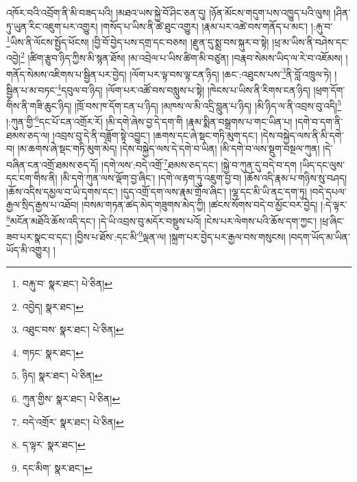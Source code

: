འཁོར་བའི་འབྲོག་ནི་མི་བཟད་པའི། །མཐའ་ཡས་སྐྱེ་བོ་ཤིང་ཅན་དུ། །ཉོན་མོངས་གདུག་པས་འཁྱུད་པའི་ལུས། །ཤིན་ཏུ་ཡུན་རིང་འཇུག་པར་འགྱུར། །གསོད་པ་ཡིས་ནི་ཚེ་ཐུང་འགྱུར། །རྣམ་པར་འཚེ་བས་གནོད་པ་མང་། །:རྐུ་བ་\footnote{བརྐུ་བ་  སྣར་ཐང་།  པེ་ཅིན། }ཡིས་ནི་ལོངས་སྤྱོད་ཕོངས། །བྱི་བོ་བྱེད་པས་དགྲ་དང་བཅས། །རྫུན་དུ་སྨྲ་བས་སྐུར་བ་སྟེ། །ཕྲ་མ་ཡིས་ནི་བཤེས་དང་འབྱེ།\footnote{འབྱེད།  སྣར་ཐང་། } །ཚིག་རྩུབ་ཉིད་ཀྱིས་མི་སྙན་ཐོས། །མ་འབྲེལ་པ་ཡིས་ཚིག་མི་བཙུན། །བརྣབ་སེམས་ཡིད་ལ་རེ་བ་འཇོམས། །གནོད་སེམས་འཇིགས་པ་སྦྱིན་པར་བྱེད། །ལོག་པར་ལྟ་བས་ལྟ་ངན་ཉིད། །ཆང་:འཐུངས་པས་\footnote{འཐུང་བས་  སྣར་ཐང་།  པེ་ཅིན། }ནི་བློ་འཁྲུལ་ཏེ། །སྦྱིན་པ་མ་བཏང་\footnote{གཏང་  སྣར་ཐང་། }དབུལ་བ་ཉིད། །ལོག་པར་འཚོ་བས་བསླུས་པ་སྟེ། །ཁེངས་པ་ཡིས་ནི་རིགས་ངན་ཉིད། །ཕྲག་དོག་གིས་ནི་གཟི་ཆུང་ཉིད། །ཁྲོ་བས་ཁ་དོག་ངན་པ་ཉིད། །མཁས་ལ་མི་འདྲི་བླུན་པ་ཉིད། །མི་ཉིད་ལ་ནི་འབྲས་བུ་འདི།\footnote{ཉིད།  སྣར་ཐང་།  པེ་ཅིན། } །:ཀུན་གྱི་\footnote{ཀུན་གྱིས་  སྣར་ཐང་།  པེ་ཅིན། }དང་པོ་ངན་འགྲོར་རོ། །མི་དགེ་ཞེས་བྱ་དེ་དག་གི །རྣམ་སྨིན་བསྒྲགས་པ་གང་ཡིན་པ། །དགེ་བ་དག་ནི་ཐམས་ཅད་ལ། །འབྲས་བུ་དེ་ནི་བཟློག་སྟེ་འབྱུང་། །ཆགས་དང་ཞེ་སྡང་གཏི་མུག་དང་། །དེས་བསྐྱེད་ལས་ནི་མི་དགེ་བ། །མ་ཆགས་ཞེ་སྡང་གཏི་མུག་མེད། །དེས་བསྐྱེད་ལས་དེ་དགེ་བ་ཡིན། །མི་དགེ་བ་ལས་སྡུག་བསྔལ་ཀུན། །དེ་བཞིན་ངན་འགྲོ་ཐམས་ཅད་དོ། །དགེ་ལས་:བདེ་འགྲོ་\footnote{བདེ་འགྲོར་  སྣར་ཐང་།  པེ་ཅིན། }ཐམས་ཅད་དང་། །སྐྱེ་བ་ཀུན་དུ་བདེ་བ་དག །ཡིད་དང་ལུས་དང་ངག་གིས་ནི། །མི་དགེ་ཀུན་ལས་ལྡོག་བྱ་ཞིང་། །དགེ་ལ་རྟག་ཏུ་འཇུག་བྱ་བ། །ཆོས་འདི་རྣམ་པ་གཉིས་སུ་བཤད། །ཆོས་འདིས་དམྱལ་བ་ཡི་དྭགས་དང་། །དུད་འགྲོ་དག་ལས་རྣམ་གྲོལ་ཞིང་། །ལྷ་དང་མི་ཡི་ནང་དག་ཏུ། །བདེ་དཔལ་རྒྱལ་སྲིད་རྒྱས་པ་འཐོབ། །བསམ་གཏན་ཚད་མེད་གཟུགས་མེད་ཀྱི། །ཚངས་སོགས་བདེ་བ་མྱོང་བར་བྱེད། །:དེ་ལྟར་\footnote{ད་ལྟར་  སྣར་ཐང་། }མངོན་མཐོའི་ཆོས་འདི་དང་། །དེ་ཡི་འབྲས་བུ་མདོར་བསྡུས་པའོ། །ངེས་པར་ལེགས་པའི་ཆོས་དག་ཀྱང་། །ཕྲ་ཞིང་ཟབ་པར་སྣང་བ་དང་། །བྱིས་པ་ཐོས་:དང་མི་\footnote{དང་མིག་  སྣར་ཐང་། }ལྡན་ལ། །སྐྲག་པར་བྱེད་པར་རྒྱལ་བས་གསུངས། །བདག་ཡོད་མ་ཡིན་ཡོད་མི་འགྱུར། །
